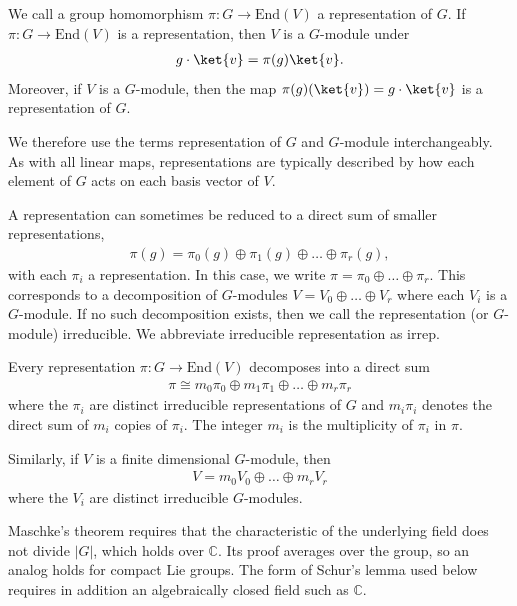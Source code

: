 \begin{lemma}
    We call a group homomorphism $\pi : G \to \mathrm{End}(V)$ a representation of $G$. If $\pi: G \to \mathrm{End}(V)$ is a representation, then $V$ is a $G$-module under 
    \begin{align}
        g \cdot \ket{v} = \pi(g)\ket{v}.
    \end{align}
    Moreover, if $V$ is a $G$-module, then the map $\pi(g)(\ket{v}) = g\cdot \ket{v}$ is a representation of $G$.
\end{lemma}
We therefore use the terms representation of $G$ and $G$-module interchangeably.
As with all linear maps, representations are typically described by how each element of $G$ acts on each basis vector of $V$.

A representation can sometimes be reduced to a direct sum of smaller representations,
\begin{align}
    \pi(g) = \pi_0(g) \oplus \pi_1(g) \oplus \dots \oplus \pi_r(g) ,
\end{align}
with each $\pi_i$ a representation.
In this case, we write $\pi = \pi_0 \oplus \dots \oplus \pi_r$.
This corresponds to a decomposition of $G$-modules $V = V_0 \oplus \dots \oplus V_r$ where each $V_i$ is a $G$-module.
If no such decomposition exists, then we call the representation (or $G$-module) irreducible.
We abbreviate irreducible representation as irrep.

\begin{theorem} \label{thm:maschkes-theorem}
    Every representation $\pi : G \to \mathrm{End}(V)$ decomposes into a direct sum
    \begin{align}
        \pi \cong m_0 \pi_0 \oplus m_1 \pi_1 \oplus \dots \oplus m_r \pi_r
    \end{align}
    where the $\pi_i$ are distinct irreducible representations of $G$ and $m_i \pi_i$ denotes the direct sum of $m_i$ copies of $\pi_i$. The integer $m_i$ is the multiplicity of $\pi_i$ in $\pi$.

    Similarly, if $V$ is a finite dimensional $G$-module, then 
    \begin{align}
        V = m_0 V_0 \oplus \dots \oplus m_r V_r
    \end{align}
    where the $V_i$ are distinct irreducible $G$-modules.
\end{theorem}
Maschke's theorem requires that the characteristic of the underlying field does not divide $|G|$, which holds over $\mathbb{C}$.
Its proof averages over the group, so an analog holds for compact Lie groups.
The form of Schur's lemma used below requires in addition an algebraically closed field such as $\mathbb{C}$.

